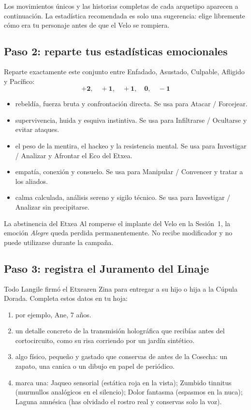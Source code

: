 Los movimientos únicos y las historias completas de cada arquetipo aparecen a continuación. La estadística recomendada es solo una sugerencia: elige libremente cómo era tu personaje antes de que el Velo se rompiera.

\subsection{Paso 2: reparte tus estadísticas emocionales}

Reparte exactamente este conjunto entre Enfadado, Asustado, Culpable, Afligido y Pacífico:
\[
\mathbf{+2,\quad +1,\quad +1,\quad 0,\quad -1}
\]

\begin{itemize}
  \item {} rebeldía, fuerza bruta y confrontación directa. Se usa para Atacar / Forcejear.
  \item {} supervivencia, huida y esquiva instintiva. Se usa para Infiltrarse / Ocultarse y evitar ataques.
  \item {} el peso de la mentira, el hackeo y la resistencia mental. Se usa para Investigar / Analizar y Afrontar el Eco del Etxea.
  \item {} empatía, conexión y consuelo. Se usa para Manipular / Convencer y tratar a los aliados.
  \item {} calma calculada, análisis sereno y sigilo técnico. Se usa para Investigar / Analizar sin precipitarse.
\end{itemize}

\begin{CajaRegla}{La abstinencia del Etxea}
Al romperse el implante del Velo en la Sesión~1, la emoción \emph{Alegre} queda perdida permanentemente. No recibe modificador y no puede utilizarse durante la campaña.
\end{CajaRegla}

\subsection{Paso 3: registra el Juramento del Linaje}

Todo Langile firmó el Etxearen Zina para entregar a su hijo o hija a la Cúpula Dorada. Completa estos datos en tu hoja:

\begin{enumerate}
  \item {} por ejemplo, Ane, 7 años.
  \item {} un detalle concreto de la transmisión holográfica que recibías antes del cortocircuito, como su risa corriendo por un jardín sintético.
  \item {} algo físico, pequeño y gastado que conservas de antes de la Cosecha: un zapato, una canica o un dibujo en papel de periódico.
  \item {} marca una: Jaqueo sensorial (estática roja en la vista); Zumbido tinnitus (murmullos analógicos en el silencio); Dolor fantasma (espasmos en la nuca); Laguna amnésica (has olvidado el rostro real y conservas solo la voz).
\end{enumerate}

